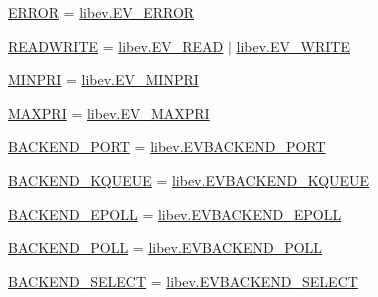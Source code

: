 \begin{DoxyCompactItemize}
\item 
\hyperlink{namespacegevent_1_1libev_1_1corecffi_a66ca0abdae895afabdb35e77709cd8b2}{E\+R\+R\+OR} = \hyperlink{libev_2__corecffi__cdef_8c_a27b348ffd20ee22cf301edf893debd41}{libev.\+E\+V\+\_\+\+E\+R\+R\+OR}
\item 
\hyperlink{namespacegevent_1_1libev_1_1corecffi_afd46ac53bb7ea6b60462f4d94a65eeed}{R\+E\+A\+D\+W\+R\+I\+TE} = \hyperlink{libev_2__corecffi__cdef_8c_a74bbaf2d529670cc0ab793497b41700f}{libev.\+E\+V\+\_\+\+R\+E\+AD} $\vert$ \hyperlink{libev_2__corecffi__cdef_8c_a2a31813fa3b26bf2d150512cbbf893f7}{libev.\+E\+V\+\_\+\+W\+R\+I\+TE}
\item 
\hyperlink{namespacegevent_1_1libev_1_1corecffi_a0decdab3e202a2d508942d410a4819b9}{M\+I\+N\+P\+RI} = \hyperlink{libev_2__corecffi__cdef_8c_a339843bb19b59465b317fc3707e1cf23}{libev.\+E\+V\+\_\+\+M\+I\+N\+P\+RI}
\item 
\hyperlink{namespacegevent_1_1libev_1_1corecffi_afc3252c90f89faa5dd0f529d9e7a217e}{M\+A\+X\+P\+RI} = \hyperlink{libev_2__corecffi__cdef_8c_ae4952f5dba79eb693ddce1ab3d2bb209}{libev.\+E\+V\+\_\+\+M\+A\+X\+P\+RI}
\item 
\hyperlink{namespacegevent_1_1libev_1_1corecffi_a1a30bd13548d311adcc715d981ec298d}{B\+A\+C\+K\+E\+N\+D\+\_\+\+P\+O\+RT} = \hyperlink{libev_2__corecffi__cdef_8c_ad9005183329a709c2560c36ee67d83be}{libev.\+E\+V\+B\+A\+C\+K\+E\+N\+D\+\_\+\+P\+O\+RT}
\item 
\hyperlink{namespacegevent_1_1libev_1_1corecffi_aef48e29e1dded0bf05e23e36fcedc6fd}{B\+A\+C\+K\+E\+N\+D\+\_\+\+K\+Q\+U\+E\+UE} = \hyperlink{libev_2__corecffi__cdef_8c_a1f60a96f75da93268d5add6cad7073d8}{libev.\+E\+V\+B\+A\+C\+K\+E\+N\+D\+\_\+\+K\+Q\+U\+E\+UE}
\item 
\hyperlink{namespacegevent_1_1libev_1_1corecffi_a2ce6be7bdafaebda551c735e79286463}{B\+A\+C\+K\+E\+N\+D\+\_\+\+E\+P\+O\+LL} = \hyperlink{libev_2__corecffi__cdef_8c_a1746b8c9e33cde9f6caaffb9f9cc82d3}{libev.\+E\+V\+B\+A\+C\+K\+E\+N\+D\+\_\+\+E\+P\+O\+LL}
\item 
\hyperlink{namespacegevent_1_1libev_1_1corecffi_af0568ba14ed137412e1c520da18e20aa}{B\+A\+C\+K\+E\+N\+D\+\_\+\+P\+O\+LL} = \hyperlink{libev_2__corecffi__cdef_8c_ad55c77b44fa5e8708222681c7f6bcac7}{libev.\+E\+V\+B\+A\+C\+K\+E\+N\+D\+\_\+\+P\+O\+LL}
\item 
\hyperlink{namespacegevent_1_1libev_1_1corecffi_abb84dbac63cbf3132a03edb879f76945}{B\+A\+C\+K\+E\+N\+D\+\_\+\+S\+E\+L\+E\+CT} = \hyperlink{libev_2__corecffi__cdef_8c_ae11cf32a2830cdc89f687f2b2e3af51a}{libev.\+E\+V\+B\+A\+C\+K\+E\+N\+D\+\_\+\+S\+E\+L\+E\+CT}

\end{DoxyCompactItemize}
